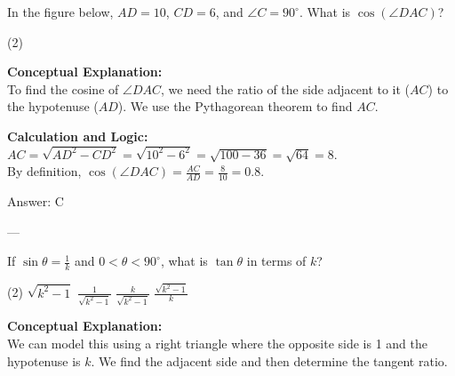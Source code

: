 \documentclass[11pt,paper=a4,answers]{exam}
\begin{document}
\begin{questions}
\question
In the figure below, $AD = 10$, $CD = 6$, and $\angle C = 90^\circ$. What is $\cos (\angle DAC)$?
\begin{center}
\end{center}
\begin{tasks}(2)
\end{tasks}

\begin{solution}
\textbf{Conceptual Explanation:} \\
To find the cosine of $\angle DAC$, we need the ratio of the side adjacent to it ($AC$) to the hypotenuse ($AD$). We use the Pythagorean theorem to find $AC$.

\vspace{10pt}
\textbf{Calculation and Logic:} \\
$AC = \sqrt{AD^2 - CD^2} = \sqrt{10^2 - 6^2} = \sqrt{100 - 36} = \sqrt{64} = 8$. \\
By definition, $\cos(\angle DAC) = \frac{AC}{AD} = \frac{8}{10} = 0.8$.

\vspace{15pt}
Answer: \colorbox{yellow!100}{C}
\end{solution}

---

\question
If $\sin \theta = \frac{1}{k}$ and $0 < \theta < 90^\circ$, what is $\tan \theta$ in terms of $k$?
\begin{tasks}(2)
    \task $\sqrt{k^2-1}$
    \task $\frac{1}{\sqrt{k^2-1}}$
    \task $\frac{k}{\sqrt{k^2-1}}$
    \task $\frac{\sqrt{k^2-1}}{k}$
\end{tasks}

\begin{solution}
\textbf{Conceptual Explanation:} \\
We can model this using a right triangle where the opposite side is 1 and the hypotenuse is $k$. We find the adjacent side and then determine the tangent ratio.


\end{solution}
\end{questions}
\end{document}
